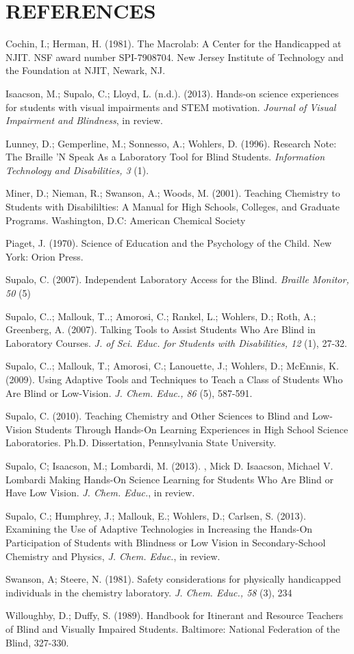 \documentclass[11.5pt]{sig-alternate} %
\begin{document}
\section*{REFERENCES}\par 

\leftskip 0.25in
\parindent -0.25in 
Cochin, I.; Herman, H. (1981). The Macrolab: A Center for the Handicapped at NJIT. NSF award number SPI-7908704. New Jersey Institute of Technology and the Foundation at NJIT, Newark, NJ.

Isaacson, M.; Supalo, C.; Lloyd, L. (n.d.). (2013). Hands-on science experiences for students with visual impairments and STEM motivation. \textit{Journal of Visual Impairment and Blindness}, in review.

Lunney, D.; Gemperline, M.; Sonnesso, A.; Wohlers, D. (1996). Research Note: The Braille ’N Speak As a Laboratory Tool for Blind Students. \textit{Information Technology and Disabilities, 3} (1).

Miner, D.; Nieman, R.; Swanson, A.; Woods, M. (2001). Teaching Chemistry to Students with Disabililties: A Manual for High Schools, Colleges, and Graduate Programs. Washington, D.C: American Chemical Society

Piaget, J. (1970). Science of Education and the Psychology of the Child. New York: Orion Press.

Supalo, C. (2007). Independent Laboratory Access for the Blind. \textit{Braille Monitor, 50} (5)

Supalo, C..; Mallouk, T..; Amorosi, C.; Rankel, L.; Wohlers, D.; Roth, A.; Greenberg, A. (2007). Talking Tools to Assist Students Who Are Blind in Laboratory Courses. \textit{J. of Sci. Educ. for Students with Disabilities, 12} (1), 27-32.

Supalo, C..; Mallouk, T.; Amorosi, C.; Lanouette, J.; Wohlers, D.; McEnnis, K. (2009). Using Adaptive Tools and Techniques to Teach a Class of Students Who Are Blind or Low-Vision. \textit{J. Chem. Educ., 86} (5), 587-591.

Supalo, C. (2010). Teaching Chemistry and Other Sciences to Blind and Low-Vision Students Through Hands-On Learning Experiences in High School Science Laboratories. Ph.D. Dissertation, Pennsylvania State University.

Supalo, C; Isaacson, M.; Lombardi, M. (2013). , Mick D. Isaacson, Michael V. Lombardi  Making Hands-On Science Learning for Students Who Are Blind or Have Low Vision. \textit{J. Chem. Educ.}, in review.

Supalo, C.; Humphrey, J.; Mallouk, E.; Wohlers, D.; Carlsen, S. (2013). Examining the Use of Adaptive Technologies in Increasing the Hands-On Participation of Students with Blindness or Low Vision in Secondary-School Chemistry and Physics, \textit{J. Chem. Educ.}, in review.

Swanson, A; Steere, N. (1981). Safety considerations for physically handicapped individuals in the chemistry laboratory.  \textit{J. Chem. Educ., 58} (3), 234

Willoughby, D.; Duffy, S. (1989). Handbook for Itinerant and Resource Teachers of Blind and Visually Impaired Students. Baltimore: National Federation of the Blind, 327-330.
\end{document}
